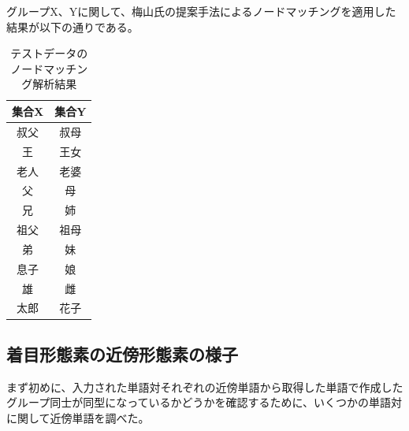 グループX、Yに関して、梅山氏の提案手法によるノードマッチングを適用した結果が以下の通りである。
\begin{table}
  \centering
  \caption[テストデータのノードマッチング解析結果]{テストデータのノードマッチング解析結果}
  \begin{tabular}{|c||c|} \hline
    集合X & 集合Y \\ \hline \hline
    叔父 & 叔母 \\
    王 & 王女 \\
    老人 & 老婆 \\
    父 & 母 \\
    兄 & 姉 \\
    祖父 & 祖母 \\
    弟 & 妹 \\
    息子 & 娘 \\
    雄 & 雌 \\
    太郎 & 花子 \\ \hline
  \end{tabular}
\end{table}
\subsection{着目形態素の近傍形態素の様子}
まず初めに、入力された単語対それぞれの近傍単語から取得した単語で作成したグループ同士が同型になっているかどうかを確認するために、いくつかの単語対に関して近傍単語を調べた。

